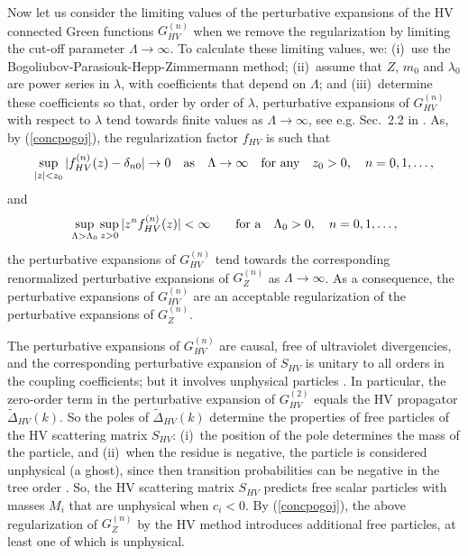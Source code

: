 \documentclass[a4paper,12pt]{article}
\newcommand{\prop}{\widetilde{\Delta}}
\newcommand{\propR}{\prop_{HV}}
\newcommand{\unreg}{f_{HV}}
\newcommand{\Gf}{G^{(n)}}
\newcommand{\GfZ}{\Gf_Z}
\newcommand{\GfR}{\Gf_{HV}}
\newcommand{\SmR}{S_{HV}}
\begin{document}
Now let us consider the limiting values of the perturbative expansions of the HV connected Green functions $\GfR$ when we remove the regularization by limiting the cut-off parameter $\Lambda \to \infty$. To calculate these limiting values, we: (i)~use the Bogoliubov-Parasiouk-Hepp-Zimmermann method; (ii)~assume that $Z$, $m_0$ and $\lambda_0$ are power series in $\lambda$, with coefficients that depend on $\Lambda$; and (iii)~determine these coefficients so that, order by order of $\lambda$, perturbative expansions of $\GfR$ with respect to $\lambda$ tend towards finite values as $\Lambda \to \infty$, see e.g. Sec.~2.2 in \cite{Cheng}. As, by (\ref{concpogoj}), the regularization factor $\unreg$ is such that
\begin{displaymath}
   \sup_{|z| < z_0} |\unreg^{(n)}(z) - \delta_{n0}| \to 0 \quad{\rm as} \quad \Lambda \to \infty \quad\hbox{for any}\quad z_0 > 0 , \quad n = 0,1,\ldots, 
\end{displaymath}
and
\begin{equation}
   \sup_{\Lambda > \Lambda_0} \sup_{z > 0} | z^n \unreg^{(n)} (z)| < \infty \qquad\hbox{for a} \quad\Lambda_0 > 0 ,\quad n = 0,1,\ldots, 
   \label{regucond0}
\end{equation}
the perturbative expansions of $\GfR$ tend towards the corresponding renormalized perturbative expansions of $\GfZ$ as $\Lambda \to \infty$. As a consequence, the perturbative expansions of $\GfR$ are an acceptable regularization of the perturbative expansions of $\GfZ$.

The perturbative expansions of $\GfR$ are causal, free of ultraviolet divergencies, and the corresponding perturbative expansion of $\SmR$ is unitary to all orders in the coupling coefficients; but it involves unphysical particles \cite{Hooft}. In particular, the zero-order term in the perturbative expansion of $G_{HV}^{(2)}$ equals the HV propagator $\propR(k)$. So the poles of $\propR(k)$ determine the properties of free particles of the HV scattering matrix $\SmR$: (i)~the position of the pole determines the mass of the particle, and (ii)~when the residue is negative, the particle is considered unphysical (a ghost), since then transition probabilities can be negative in the tree order \cite{Hooft}. So, the HV scattering matrix $\SmR$ predicts free scalar particles with masses $M_i$ that are unphysical when $c_i < 0$. By (\ref{concpogoj}), the above regularization of $\GfZ$ by the HV method introduces additional free particles, at least one of which is unphysical.
\end{document}
